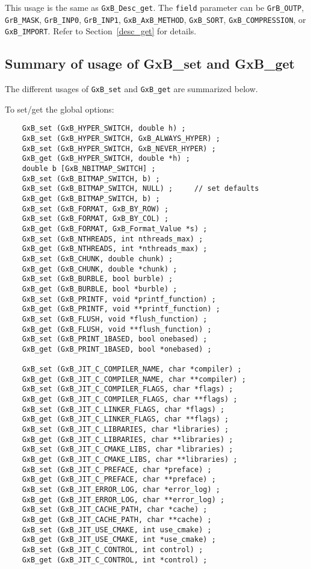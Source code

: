 \documentclass[12pt]{article}
\begin{document}
This usage is the same as \verb'GxB_Desc_get'.  The \verb'field' parameter can
be \verb'GrB_OUTP', \verb'GrB_MASK', \verb'GrB_INP0', \verb'GrB_INP1',
\verb'GxB_AxB_METHOD',
\verb'GxB_SORT',
\verb'GxB_COMPRESSION', or
\verb'GxB_IMPORT'.
Refer to Section~\ref{desc_get} for details.

\subsection{Summary of usage of {\sf GxB\_set} and {\sf GxB\_get}}

The different usages of \verb'GxB_set' and \verb'GxB_get' are summarized below.

\noindent
To set/get the global options:

    {\footnotesize
    \begin{verbatim}
    GxB_set (GxB_HYPER_SWITCH, double h) ;
    GxB_set (GxB_HYPER_SWITCH, GxB_ALWAYS_HYPER) ;
    GxB_set (GxB_HYPER_SWITCH, GxB_NEVER_HYPER) ;
    GxB_get (GxB_HYPER_SWITCH, double *h) ;
    double b [GxB_NBITMAP_SWITCH] ;
    GxB_set (GxB_BITMAP_SWITCH, b) ;
    GxB_set (GxB_BITMAP_SWITCH, NULL) ;     // set defaults
    GxB_get (GxB_BITMAP_SWITCH, b) ;
    GxB_set (GxB_FORMAT, GxB_BY_ROW) ;
    GxB_set (GxB_FORMAT, GxB_BY_COL) ;
    GxB_get (GxB_FORMAT, GxB_Format_Value *s) ;
    GxB_set (GxB_NTHREADS, int nthreads_max) ;
    GxB_get (GxB_NTHREADS, int *nthreads_max) ;
    GxB_set (GxB_CHUNK, double chunk) ;
    GxB_get (GxB_CHUNK, double *chunk) ;
    GxB_set (GxB_BURBLE, bool burble) ;
    GxB_get (GxB_BURBLE, bool *burble) ;
    GxB_set (GxB_PRINTF, void *printf_function) ;
    GxB_get (GxB_PRINTF, void **printf_function) ;
    GxB_set (GxB_FLUSH, void *flush_function) ;
    GxB_get (GxB_FLUSH, void **flush_function) ;
    GxB_set (GxB_PRINT_1BASED, bool onebased) ;
    GxB_get (GxB_PRINT_1BASED, bool *onebased) ;

    GxB_set (GxB_JIT_C_COMPILER_NAME, char *compiler) ;
    GxB_get (GxB_JIT_C_COMPILER_NAME, char **compiler) ;
    GxB_set (GxB_JIT_C_COMPILER_FLAGS, char *flags) ;
    GxB_get (GxB_JIT_C_COMPILER_FLAGS, char **flags) ;
    GxB_set (GxB_JIT_C_LINKER_FLAGS, char *flags) ;
    GxB_get (GxB_JIT_C_LINKER_FLAGS, char **flags) ;
    GxB_set (GxB_JIT_C_LIBRARIES, char *libraries) ;
    GxB_get (GxB_JIT_C_LIBRARIES, char **libraries) ;
    GxB_set (GxB_JIT_C_CMAKE_LIBS, char *libraries) ;
    GxB_get (GxB_JIT_C_CMAKE_LIBS, char **libraries) ;
    GxB_set (GxB_JIT_C_PREFACE, char *preface) ;
    GxB_get (GxB_JIT_C_PREFACE, char **preface) ;
    GxB_set (GxB_JIT_ERROR_LOG, char *error_log) ;
    GxB_get (GxB_JIT_ERROR_LOG, char **error_log) ;
    GxB_set (GxB_JIT_CACHE_PATH, char *cache) ;
    GxB_get (GxB_JIT_CACHE_PATH, char **cache) ;
    GxB_set (GxB_JIT_USE_CMAKE, int use_cmake) ;
    GxB_get (GxB_JIT_USE_CMAKE, int *use_cmake) ;
    GxB_set (GxB_JIT_C_CONTROL, int control) ;
    GxB_get (GxB_JIT_C_CONTROL, int *control) ;
    \end{verbatim} }
\end{document}

